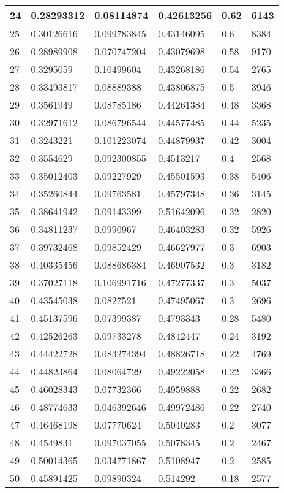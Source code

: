 \begin{longtable}{|l|l|l|l|l|l|}
24 & 0.28293312 & 0.08114874 & 0.42613256 & 0.62 & 6143 \\ \hline 
25 & 0.30126616 & 0.099783845 & 0.43146095 & 0.6 & 8384 \\ \hline 
26 & 0.28989908 & 0.070747204 & 0.43079698 & 0.58 & 9170 \\ \hline 
27 & 0.3295059 & 0.10499604 & 0.43268186 & 0.54 & 2765 \\ \hline 
28 & 0.33493817 & 0.08889388 & 0.43806875 & 0.5 & 3946 \\ \hline 
29 & 0.3561949 & 0.08785186 & 0.44261384 & 0.48 & 3368 \\ \hline 
30 & 0.32971612 & 0.086796544 & 0.44577485 & 0.44 & 5235 \\ \hline 
31 & 0.3243221 & 0.101223074 & 0.44879937 & 0.42 & 3004 \\ \hline 
32 & 0.3554629 & 0.092300855 & 0.4513217 & 0.4 & 2568 \\ \hline 
33 & 0.35012403 & 0.09227929 & 0.45501593 & 0.38 & 5406 \\ \hline 
34 & 0.35260844 & 0.09763581 & 0.45797348 & 0.36 & 3145 \\ \hline 
35 & 0.38641942 & 0.09143399 & 0.51642096 & 0.32 & 2820 \\ \hline 
36 & 0.34811237 & 0.0990967 & 0.46403283 & 0.32 & 5926 \\ \hline 
37 & 0.39732468 & 0.09852429 & 0.46627977 & 0.3 & 6903 \\ \hline 
38 & 0.40335456 & 0.088686384 & 0.46907532 & 0.3 & 3182 \\ \hline 
39 & 0.37027118 & 0.106991716 & 0.47277337 & 0.3 & 5037 \\ \hline 
40 & 0.43545038 & 0.0827521 & 0.47495067 & 0.3 & 2696 \\ \hline 
41 & 0.45137596 & 0.07399387 & 0.4793343 & 0.28 & 5480 \\ \hline 
42 & 0.42526263 & 0.09733278 & 0.4842447 & 0.24 & 3192 \\ \hline 
43 & 0.44422728 & 0.083274394 & 0.48826718 & 0.22 & 4769 \\ \hline 
44 & 0.44823864 & 0.08064729 & 0.49222058 & 0.22 & 3366 \\ \hline 
45 & 0.46028343 & 0.07732366 & 0.4959888 & 0.22 & 2682 \\ \hline 
46 & 0.48774633 & 0.046392646 & 0.49972486 & 0.22 & 2740 \\ \hline 
47 & 0.46468198 & 0.07770624 & 0.5040283 & 0.2 & 3077 \\ \hline 
48 & 0.4549831 & 0.097037055 & 0.5078345 & 0.2 & 2467 \\ \hline 
49 & 0.50014365 & 0.034771867 & 0.5108947 & 0.2 & 2585 \\ \hline 
50 & 0.45891425 & 0.09890324 & 0.514292 & 0.18 & 2577 \\ \hline 
\end{longtable}